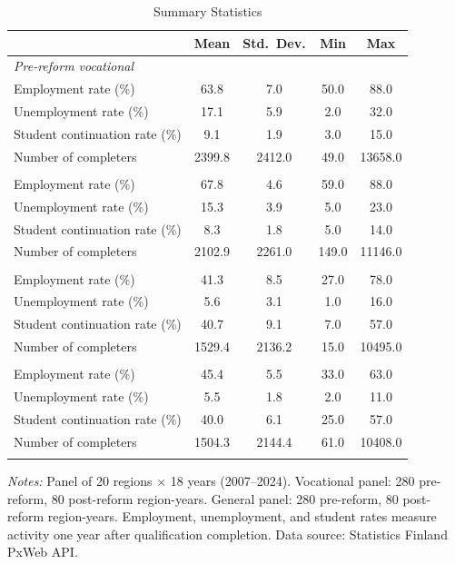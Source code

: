 \begin{table}[H]
\centering
\caption{Summary Statistics}
\label{tab:summary}
\begin{threeparttable}
\begin{tabular}{lcccc}
\toprule
 & Mean & Std.~Dev. & Min & Max \\
\midrule
\multicolumn{5}{l}{\textit{Pre-reform vocational}} \\
Employment rate (\%) & 63.8 & 7.0 & 50.0 & 88.0 \\
Unemployment rate (\%) & 17.1 & 5.9 & 2.0 & 32.0 \\
Student continuation rate (\%) & 9.1 & 1.9 & 3.0 & 15.0 \\
Number of completers & 2399.8 & 2412.0 & 49.0 & 13658.0 \\
\addlinespace
\multicolumn{5}{l}{\textit{Post-reform vocational}} \\
Employment rate (\%) & 67.8 & 4.6 & 59.0 & 88.0 \\
Unemployment rate (\%) & 15.3 & 3.9 & 5.0 & 23.0 \\
Student continuation rate (\%) & 8.3 & 1.8 & 5.0 & 14.0 \\
Number of completers & 2102.9 & 2261.0 & 149.0 & 11146.0 \\
\addlinespace
\multicolumn{5}{l}{\textit{Pre-reform general}} \\
Employment rate (\%) & 41.3 & 8.5 & 27.0 & 78.0 \\
Unemployment rate (\%) & 5.6 & 3.1 & 1.0 & 16.0 \\
Student continuation rate (\%) & 40.7 & 9.1 & 7.0 & 57.0 \\
Number of completers & 1529.4 & 2136.2 & 15.0 & 10495.0 \\
\addlinespace
\multicolumn{5}{l}{\textit{Post-reform general}} \\
Employment rate (\%) & 45.4 & 5.5 & 33.0 & 63.0 \\
Unemployment rate (\%) & 5.5 & 1.8 & 2.0 & 11.0 \\
Student continuation rate (\%) & 40.0 & 6.1 & 25.0 & 57.0 \\
Number of completers & 1504.3 & 2144.4 & 61.0 & 10408.0 \\
\addlinespace
\bottomrule
\end{tabular}
\begin{tablenotes}[flushleft]
\small
\item \textit{Notes:} Panel of 20 regions $\times$ 18 years (2007--2024). Vocational panel: 280 pre-reform, 80 post-reform region-years. General panel: 280 pre-reform, 80 post-reform region-years. Employment, unemployment, and student rates measure activity one year after qualification completion. Data source: Statistics Finland PxWeb API.
\end{tablenotes}
\end{threeparttable}
\end{table}


